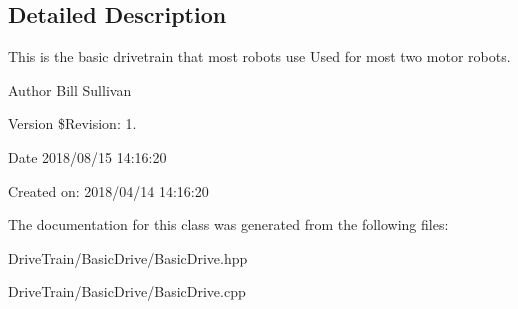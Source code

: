 \subsection{Detailed Description}
This is the basic drivetrain that most robots use Used for most two motor robots. 

\begin{DoxyAuthor}{Author}
Bill Sullivan
\end{DoxyAuthor}
\begin{DoxyVersion}{Version}
\$\+Revision\+: 1.
\end{DoxyVersion}
\begin{DoxyDate}{Date}
2018/08/15 14\+:16\+:20
\end{DoxyDate}
Created on\+: 2018/04/14 14\+:16\+:20 

The documentation for this class was generated from the following files\+:\begin{DoxyCompactItemize}
\item 
Drive\+Train/\+Basic\+Drive/Basic\+Drive.\+hpp\item 
Drive\+Train/\+Basic\+Drive/Basic\+Drive.\+cpp\end{DoxyCompactItemize}
